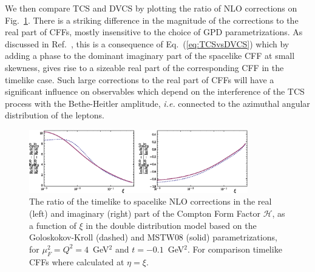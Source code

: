 We then compare TCS and DVCS by plotting the ratio of NLO corrections on
Fig.~\ref{fig:TCStoDVCS}. There is a striking difference in the magnitude of
the corrections to the real part of CFFs, mostly insensitive to the choice of
GPD parametrizations. As discussed in Ref.~\cite{Muller:2012yq}, this is a
consequence of Eq.~(\ref{eq:TCSvsDVCS}) which by adding a phase to the
dominant imaginary part of the spacelike CFF at small skewness, gives rise
to a sizeable real part of the corresponding CFF in the timelike case.
Such large corrections to the real part of CFFs will have a significant
influence on observables which depend on the interference of the TCS process
with the Bethe-Heitler amplitude, {\sl i.e.} connected to the azimuthal
angular distribution of the leptons. 
\begin{figure}[ht]
\begin{center}
  \includegraphics[width= 0.85\textwidth]{TCStoDVCS_1x2_nice.eps}
\caption{The ratio of the timelike to spacelike NLO corrections in the real
(left) and imaginary (right) part of the Compton Form Factor $\mathcal{H}$,
as a function of $\xi$ in the double distribution model based on the
Goloskokov-Kroll (dashed) and MSTW08 (solid) parametrizations, for
$\mu_F^2=Q^2=4$~GeV$^2$ and $t= -0.1$~GeV$^2$. For comparison timelike CFFs
where calculated at $\eta = \xi$.}
\label{fig:TCStoDVCS}
\end{center}
\end{figure}


